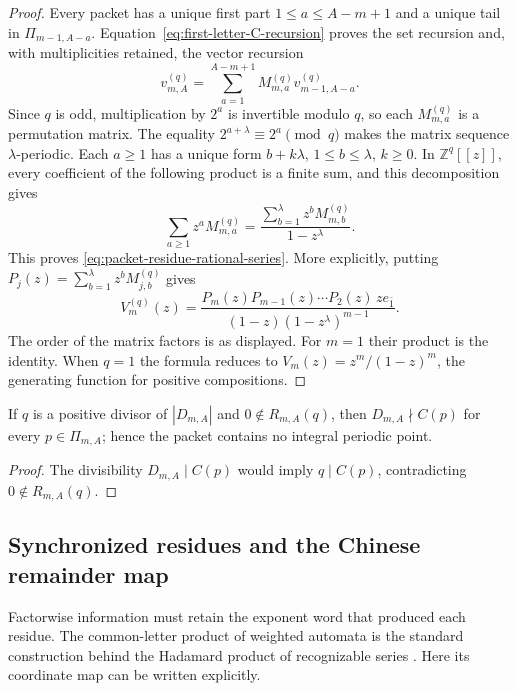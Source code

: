 \begin{proof}
Every packet has a unique first part
$1\le a\le A-m+1$ and a unique tail in $\Pi_{m-1,A-a}$.
Equation~\eqref{eq:first-letter-C-recursion} proves the set recursion and,
with multiplicities retained, the vector recursion
\[
 v_{m,A}^{(q)}=\sum_{a=1}^{A-m+1}M_{m,a}^{(q)}v_{m-1,A-a}^{(q)}.
\]
Since $q$ is odd,
multiplication by $2^a$ is invertible modulo $q$, so each $M_{m,a}^{(q)}$ is
a permutation matrix.  The equality $2^{a+\lambda}\equiv2^a\pmod q$ makes
the matrix sequence $\lambda$-periodic.  Each $a\ge1$ has a unique form
$b+k\lambda$, $1\le b\le\lambda$, $k\ge0$.  In
$\mathbb Z^q[[z]]$, every coefficient of the following product is a finite
sum, and this decomposition gives
\[
 \sum_{a\ge1}z^aM_{m,a}^{(q)}
 =\frac{\sum_{b=1}^{\lambda}z^bM_{m,b}^{(q)}}{1-z^\lambda}.
\]
This proves \eqref{eq:packet-residue-rational-series}.  More explicitly,
putting $P_j(z)=\sum_{b=1}^{\lambda}z^bM_{j,b}^{(q)}$ gives
\[
 V_m^{(q)}(z)=
 \frac{P_m(z)P_{m-1}(z)\cdots P_2(z)\,z e_{\bar1}}
 {(1-z)(1-z^\lambda)^{m-1}}.
\]
The order of the matrix factors is as displayed.  For $m=1$ their product
is the identity.  When $q=1$ the formula reduces to
$V_m(z)=z^m/(1-z)^m$, the generating function for positive compositions.
\end{proof}

\begin{corollary}
\label{cor:packet-prime-factor-exclusion}
If $q$ is a positive divisor of $|D_{m,A}|$ and $0\notin R_{m,A}(q)$, then
$D_{m,A}\nmid C(p)$ for every $p\in\Pi_{m,A}$; hence the packet contains no
integral periodic point.
\end{corollary}

\begin{proof}
The divisibility $D_{m,A}\mid C(p)$ would imply $q\mid C(p)$, contradicting
$0\notin R_{m,A}(q)$.
\end{proof}

\subsection{Synchronized residues and the Chinese remainder map}

Factorwise information must retain the exponent word that produced each
residue.  The common-letter product of weighted automata is the standard
construction behind the Hadamard product of recognizable series
\cite[Definition~4.1.4, Proposition~4.3.10]{Wirth2022}.  Here its coordinate
map can be written explicitly.

